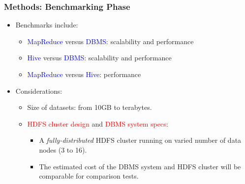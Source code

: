 \documentclass[hyperref={pdfpagelabels=false}]{beamer}
\begin{document}
\begin{frame}
\frametitle{Methods: Benchmarking Phase}


\begin{itemize}
 \item Benchmarks include:
  \begin{itemize}
    \pause
   \item \textcolor{blue}{MapReduce} versus \textcolor{blue}{DBMS}: scalability
and performance
    \pause
    \item \textcolor{blue}{Hive} versus \textcolor{blue}{DBMS}: scalability and
performance
   \pause
    \item \textcolor{blue}{MapReduce} versus \textcolor{blue}{Hive}: performance
  \end{itemize}
\pause
\item Considerations:
\pause
  \begin{itemize}
    \item Size of datasets: from 10GB to terabytes. 
    \pause
    \item \textcolor{red}{HDFS cluster design} and \textcolor{red}{DBMS system
specs}: 
    \pause
    \begin{itemize}
      \item A {\it fully-distributed} HDFS cluster running on varied number of
            data nodes (3 to 16).
      \pause
      \item The estimated cost of the DBMS system and HDFS cluster will be
            comparable for comparison tests.
    \end{itemize}

  \end{itemize}
\end{itemize}
\end{frame}
\end{document}
